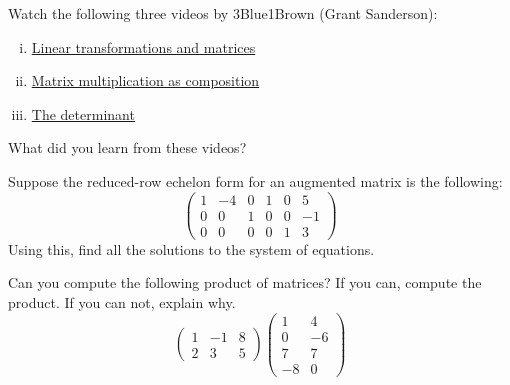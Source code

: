 \documentclass[11pt,letterpaper]{article}
\begin{document}

 Watch the following three videos by 3Blue1Brown (Grant Sanderson):
	\begin{enumerate}[(i)]
	\item \href{https://www.youtube.com/watch?v=kYB8IZa5AuE&list=PL0-GT3co4r2y2YErbmuJw2L5tW4Ew2O5B&index=4&ab_channel=3Blue1Brown}{Linear transformations and matrices}
	\item \href{https://www.youtube.com/watch?v=XkY2DOUCWMU&list=PL0-GT3co4r2y2YErbmuJw2L5tW4Ew2O5B&index=5&ab_channel=3Blue1Brown}{Matrix multiplication as composition}
	\item \href{https://www.youtube.com/watch?v=Ip3X9LOh2dk&list=PL0-GT3co4r2y2YErbmuJw2L5tW4Ew2O5B&index=7&ab_channel=3Blue1Brown}{The determinant}
	\end{enumerate}
What did you learn from these videos? 





\newpage





 Suppose the reduced-row echelon form for an augmented matrix is the following:
	\[
	\begin{pmatrix}
	1 & -4 & 0 & 1 & 0 & 5 \\
	0 & 0 & 1 & 0 & 0 & -1 \\
	0 & 0 & 0 & 0 & 1 & 3
	\end{pmatrix}
	\]
Using this, find all the solutions to the system of equations. 





\newpage





 Can you compute the following product of matrices? If you can, compute the product. If you can not, explain why. 
	\[
	\begin{pmatrix}
	1 & -1 & 8 \\
	2 & 3 & 5 
	\end{pmatrix}
	\begin{pmatrix}
	1 & 4 \\
	0 & -6 \\
	7 & 7 \\
	-8 & 0
	\end{pmatrix}
	\]
\end{document}
